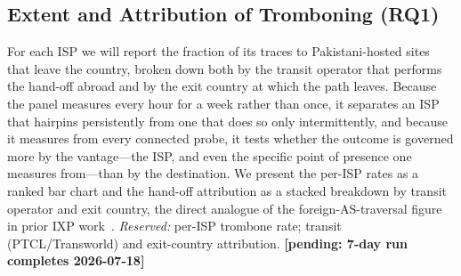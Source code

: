 \documentclass[sigconf,anonymous,10pt]{acmart}
\newcommand{\pending}{\textbf{[pending: 7-day run completes 2026-07-18]}}
\begin{document}
\subsection{Extent and Attribution of Tromboning (RQ1)}
\label{sec:rq1}
For each ISP we will report the fraction of its traces to Pakistani-hosted sites that leave the
country, broken down both by the transit operator that performs the hand-off abroad and by the exit
country at which the path leaves. Because the panel measures every hour for a week rather than once,
it separates an ISP that hairpins persistently from one that does so only intermittently, and
because it measures from every connected probe, it tests whether the outcome is governed more by the
vantage---the ISP, and even the specific point of presence one measures from---than by the
destination. We present the per-ISP rates as a ranked bar chart and the hand-off attribution as a
stacked breakdown by transit operator and exit country, the direct analogue of the
foreign-AS-traversal figure in prior IXP work~\cite{dibartolomeo2015}.
\emph{Reserved:} per-ISP trombone rate; transit (PTCL/Transworld) and exit-country attribution. \pending
\end{document}
